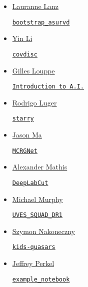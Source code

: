 \documentclass[11pt,a4paper]{article}
\begin{document}
\begin{itemize}
\item \href{https://github.com/lalanz/}{Lauranne Lanz}
  \begin{itemize}
    \href{https://github.com/lalanz/bootstrap\_asurv}{\tt bootstrap\_asurvd}
  \end{itemize}

\item \href{https://github.com/eelregit/}{Yin Li} 
  \begin{itemize}
    \href{https://github.com/eelregit/covdisc}{\tt covdisc}
  \end{itemize}

\item \href{https://github.com/glouppe}{Gilles Louppe}
  \begin{itemize}
    \href{https://github.com/glouppe/info8006-introduction-to-ai}{\tt  Introduction to A.I.}
  \end{itemize}

\item \href{https://github.com/rodluger}{Rodrigo Luger}
  \begin{itemize}
    \href{https://github.com/rodluger/starry}{{\tt starry}}
  \end{itemize}

\item \href{https://github.com/myinxd}{Jason Ma}
  \begin{itemize}
    \href{https://github.com/myinxd/mcrgnet}{\tt MCRGNet}
  \end{itemize}

\item \href{https://github.com/AlexEMG}{Alexander Mathis}
  \begin{itemize}
    \href{https://github.com/AlexEMG/DeepLabCut}{\tt DeepLabCut} 
  \end{itemize}

\item \href{https://github.com/MTMurphy77/}{Michael Murphy}
  \begin{itemize}
    \href{https://github.com/MTMurphy77/UVES_SQUAD_DR1}{\tt UVES\_SQUAD\_DR1}
  \end{itemize}

  \item \href{https://github.com/snakoneczny}{Szymon Nakoneczny}
  \begin{itemize}
    \href{https://github.com/snakoneczny/kids-quasars}{\tt kids-quasars}
  \end{itemize}

\item \href{https://github.com/jperkel/}{Jeffrey Perkel}
  \begin{itemize}
    \href{https://github.com/jperkel/example_notebook}{\tt example\_notebook}
  \end{itemize}


\end{itemize}
\end{document}
